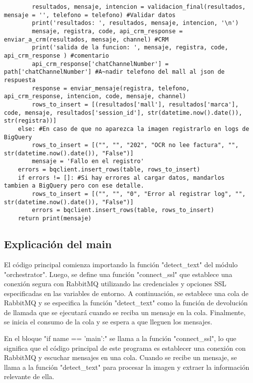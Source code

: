 \documentclass{article}
\begin{document}
\begin{lstlisting}
        resultados, mensaje, intencion = validacion_final(resultados, mensaje = '', telefono = telefono) #Validar datos
        print('resultados: ', resultados, mensaje, intencion, '\n')
        mensaje, registra, code, api_crm_response = enviar_a_crm(resultados, mensaje, channel) #CRM
        print('salida de la funcion: ', mensaje, registra, code, api_crm_response ) #comentario
        api_crm_response['chatChannelNumber'] = path['chatChannelNumber'] #A~nadir telefono del mall al json de respuesta
        response = enviar_mensaje(registra, telefono, api_crm_response, intencion, code, mensaje, channel)
        rows_to_insert = [(resultados['mall'], resultados['marca'], code, mensaje, resultados['session_id'], str(datetime.now().date()), str(registra))]
    else: #En caso de que no aparezca la imagen registrarlo en logs de BigQuery
        rows_to_insert = [("", "", "202", "OCR no lee factura", "", str(datetime.now().date()), "False")]
        mensaje = 'Fallo en el registro'
    errors = bqclient.insert_rows(table, rows_to_insert)
    if errors != []: #Si hay errores al cargar datos, mandarlos tambien a BigQuery pero con ese detalle.
        rows_to_insert = [("", "", "0", "Error al registrar log", "", str(datetime.now().date()), "False")]
        errors = bqclient.insert_rows(table, rows_to_insert)
    return print(mensaje)
\end{lstlisting}

\subsection{Explicación del main}
El código principal comienza importando la función "detect\_text" del módulo "orchestrator". Luego, se define una función "connect\_ssl" que establece una conexión segura con RabbitMQ utilizando las credenciales y opciones SSL especificadas en las variables de entorno. A continuación, se establece una cola de RabbitMQ y se especifica la función "detect\_text" como la función de devolución de llamada que se ejecutará cuando se reciba un mensaje en la cola. Finalmente, se inicia el consumo de la cola y se espera a que lleguen los mensajes.

En el bloque "if name == 'main':" se llama a la función "connect\_ssl", lo que significa que el código principal de este programa es establecer una conexión con RabbitMQ y escuchar mensajes en una cola. Cuando se recibe un mensaje, se llama a la función "detect\_text" para procesar la imagen y extraer la información relevante de ella.
\end{document}
